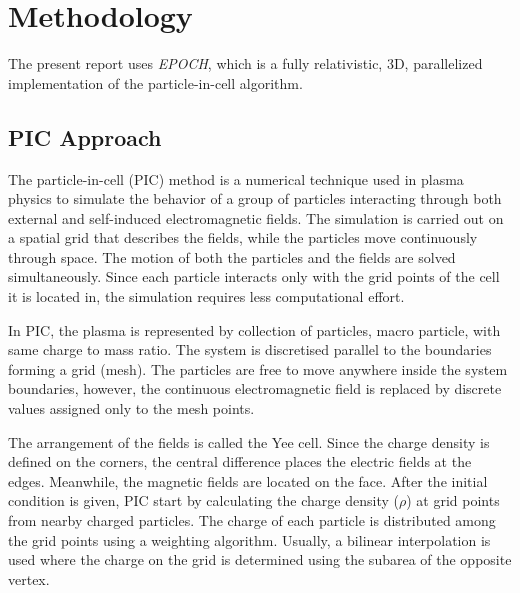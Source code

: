 \section{Methodology}

The present report uses \textit{EPOCH}\cite{EPOCH}, which is a fully relativistic, 3D, parallelized implementation of the particle-in-cell algorithm.

\subsection{PIC Approach}
The particle-in-cell (PIC) method is a numerical technique used in plasma physics to simulate the behavior of a group of particles interacting through both external and self-induced electromagnetic fields. The simulation is carried out on a spatial grid that describes the fields, while the particles move continuously through space. The motion of both the particles and the fields are solved simultaneously. Since each particle interacts only with the grid points of the cell it is located in, the simulation requires less computational effort. \cite{suciu}

In PIC, the plasma is represented by collection of particles, macro particle, with same charge to mass ratio. The system is discretised parallel to the boundaries forming a grid (mesh). The particles are free to move anywhere inside the system boundaries, however, the continuous electromagnetic field is replaced by discrete values assigned only to the mesh points.

The arrangement of the fields is called the Yee cell. Since the charge density is defined on the corners, the central difference places the electric fields at the edges. Meanwhile, the magnetic fields are located on the face. After the initial condition is given, PIC start by calculating the charge density ($\rho$) at grid points from nearby charged particles. The charge of each particle is distributed among the grid points using a weighting algorithm. Usually, a bilinear interpolation is used where the charge on the grid is determined using the subarea of the opposite vertex.

